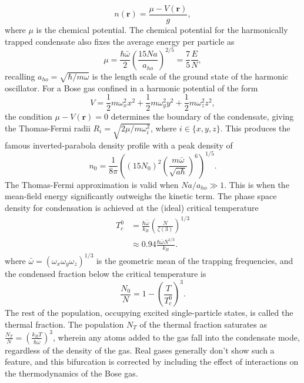 	
	\begin{equation}
		n(\textbf{r}) = \frac{\mu-V(\textbf{r})}{g},
	\end{equation}
	where $\mu$ is the chemical potential.
	The chemical potential for the harmonically trapped condensate also fixes the average energy per particle as
	\begin{equation}
		\mu = \frac{\hbar\bar{\omega}}{2}\left(\frac{15 N a}{a_{ho}}\right)^{2/5} = \frac{7}{5}\frac{E}{N},
	\end{equation}
	recalling $a_{ho} = \sqrt{\hbar/m\omega}$ is the length scale of the ground state of the harmonic oscillator.
	For a Bose gas confined in a harmonic potential of the form
	\begin{equation}
		V = \frac{1}{2} m \omega_x^2 x^2 + \frac{1}{2} m \omega_y^2 y^2 + \frac{1}{2} m \omega_z^2 z^2,
	\end{equation}
	the condition $\mu-V(\textbf{r})=0$ determines the boundary of the condensate, giving the Thomas-Fermi radii $R_i = \sqrt{2\mu/m \omega_i^2}$, where $i\in\{x,y,z\}$.
	This produces the famous inverted-parabola density profile with a peak density of
	\begin{equation}
		n_0 = \frac{1}{8 \pi}\left( (15N_0)^2 \left(\frac{m \bar{\omega}}{\sqrt{a \hbar}}\right)^{6}\right)^{1/5}.
		\label{eqn:n0}
	\end{equation}
	The Thomas-Fermi approximation is valid when $N a/a_{ho}\gg1$. 
	This is when the mean-field energy significantly outweighs the kinetic term.
	The phase space density for condensation is achieved at the (ideal) critical temperature 
	\begin{align}
		T_c^{0} &= \frac{\hbar \bar{\omega}}{k_B}\left(\frac{N}{\zeta(3)}\right)^{1/3}\\
				&\approx0.94\frac{\hbar \bar{\omega} N^{1/3}}{k_B}.
	\end{align}
	where $\bar{\omega}=(\omega_x\omega_y\omega_z)^{1/3}$ is the geometric mean of the trapping frequencies, and the condensed fraction below the critical temperature is 
	\begin{equation}
		\frac{N_0}{N} = 1 - \left(\frac{T}{T_c^{0}}\right)^3.
	\end{equation}
	The rest of the population, occupying excited single-particle states, is called the thermal fraction.
	The population $N_T$ of the thermal fraction saturates as $\frac{N_T}{N} = \left(\frac{k_B T}{\hbar \bar{\omega}}\right)^3$, wherein any atoms added to the gas fall into the condensate mode, regardless of the density of the gas.
	Real gases generally don't show such a feature, and this bifurcation is corrected by including the effect of interactions on the thermodynamics of the Bose gas.	 
